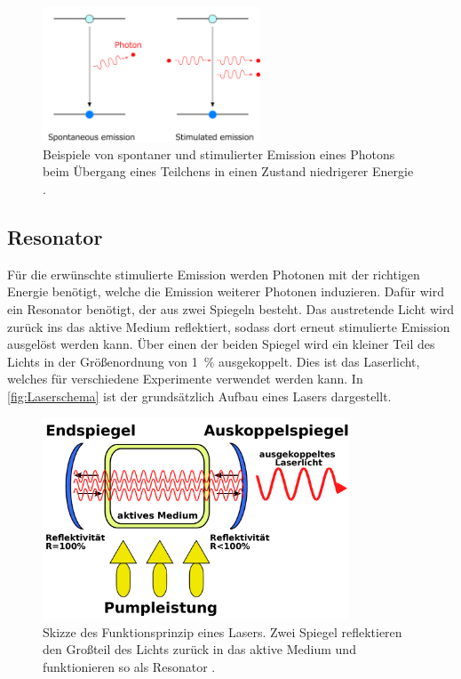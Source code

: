 \begin{figure}
    \centering
    \includegraphics[height=4cm]{content/pics/Stimulierte_Emission.png}
    \caption{Beispiele von spontaner und stimulierter Emission eines Photons beim Übergang eines Teilchens in einen Zustand niedrigerer Energie \cite{Stimulated_Emission}.}
    \label{fig:Stimulierte_Emission}
\end{figure}

\subsection{Resonator}
Für die erwünschte stimulierte Emission werden Photonen mit der richtigen Energie benötigt, welche die Emission weiterer Photonen induzieren. Dafür wird ein 
Resonator benötigt, der aus zwei Spiegeln besteht. Das austretende Licht wird zurück ins das aktive Medium reflektiert, sodass dort erneut stimulierte Emission
ausgelöst werden kann. Über einen der beiden Spiegel wird ein kleiner Teil des Lichts in der Größenordnung von \qty{1}{\percent} ausgekoppelt. Dies ist das Laserlicht,
welches für verschiedene Experimente verwendet werden kann. In \autoref{fig:Laserschema} ist der grundsätzlich Aufbau eines Lasers dargestellt.

\begin{figure}
    \centering
    \includegraphics[height=6cm]{content/pics/Laserschema.pdf}
    \caption{Skizze des Funktionsprinzip eines Lasers. Zwei Spiegel reflektieren den Großteil des Lichts zurück in das aktive Medium und funktionieren so
    als Resonator \cite{Laserschema}.}
    \label{fig:Laserschema}
\end{figure}

